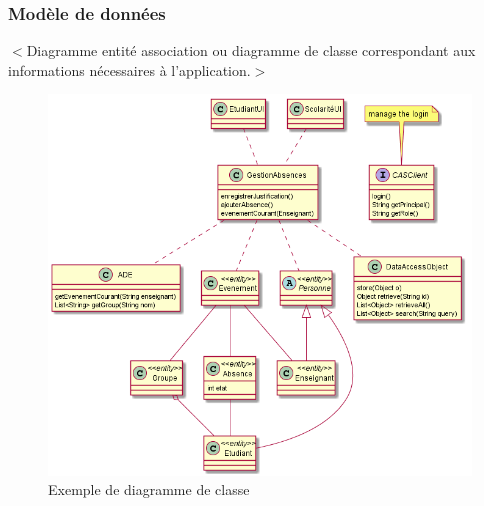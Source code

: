 \documentclass{scrreprt}
\begin{document}
\subsubsection{Modèle de données}
$<$Diagramme entité association ou diagramme de classe correspondant aux informations nécessaires à l'application.$>$

\begin{figure}
\includegraphics[width=\textwidth]{"AbsencesClasses"}
\caption{Exemple de diagramme de classe}
\end{figure}




\end{document}
